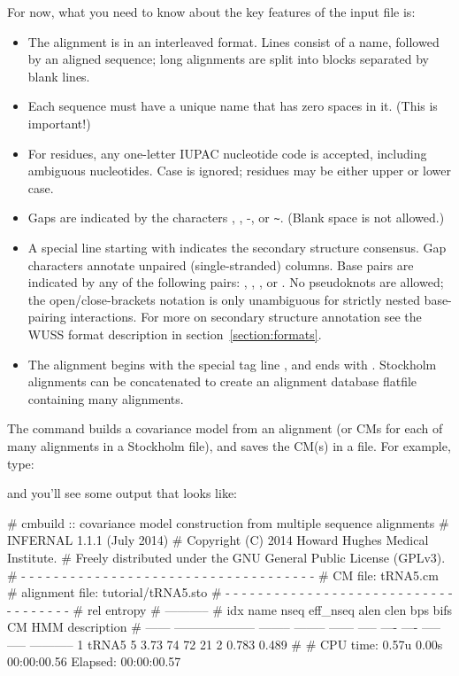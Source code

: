 For now, what you need to know about the key features of the input file is:
\begin{itemize}
\item The alignment is in an interleaved format.
Lines consist of a name, followed by an aligned sequence;
long alignments are split into blocks separated by blank lines.
\item Each sequence must have a unique name that has zero spaces in it. (This is important!)
\item For residues, any one-letter IUPAC nucleotide code is accepted,
      including ambiguous nucleotides. Case is ignored; residues
      may be either upper or lower case.
\item Gaps are indicated by the characters , \otext{\_}, -, or \verb+~+.
      (Blank space is not allowed.)
\item A special line starting with  indicates
      the secondary structure consensus. Gap characters annotate
      unpaired (single-stranded) columns. Base pairs are indicated
      by any of the following pairs: \otext{<>}, \otext{()}, \otext{[]},
      or \otext{\{\}}. No pseudoknots are allowed; the
      open/close-brackets notation is only unambiguous for strictly
      nested base-pairing interactions.
      For more on secondary structure annotation see the WUSS format
      description in section~\ref{section:formats}.
\item The alignment begins with the special tag line
      , and ends with \otext{//}.
      Stockholm alignments
      can be concatenated to create an alignment database flatfile
      containing many alignments.
\end{itemize}

The  command builds a covariance model from an alignment (or
CMs for each of many alignments in a Stockholm file), and saves the
CM(s) in a file. For example, type:


and you'll see some output that looks like:

\begin{sreoutput}
# cmbuild :: covariance model construction from multiple sequence alignments
# INFERNAL 1.1.1 (July 2014)
# Copyright (C) 2014 Howard Hughes Medical Institute.
# Freely distributed under the GNU General Public License (GPLv3).
# - - - - - - - - - - - - - - - - - - - - - - - - - - - - - - - - - - - -
# CM file:                                            tRNA5.cm
# alignment file:                                     tutorial/tRNA5.sto
# - - - - - - - - - - - - - - - - - - - - - - - - - - - - - - - - - - - -
#                                                                      rel entropy
#                                                                      -----------
# idx    name                     nseq eff_nseq   alen  clen  bps bifs    CM   HMM description
# ------ -------------------- -------- -------- ------ ----- ---- ---- ----- ----- -----------
       1 tRNA5                       5     3.73     74    72   21    2 0.783 0.489 
#
# CPU time: 0.57u 0.00s 00:00:00.56 Elapsed: 00:00:00.57
\end{sreoutput}

